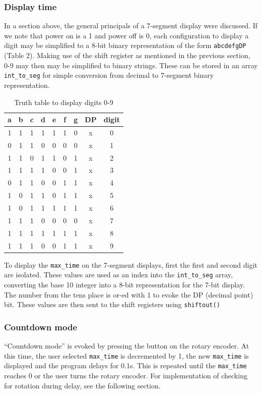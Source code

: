 \documentclass[fleqn]{article}
\begin{document}
\subsubsection*{Display time}
In a section above, the general principals of a 7-segment display were discussed. If we note that power on is a 1 and power off is 0, each configuration to display a digit may be simplified to a 8-bit binary representation of the form \verb|abcdefgDP| (Table 2). Making use of the shift register as mentioned in the previous section, 0-9 may then may be simplified to binary strings. These can be stored in an array \verb|int_to_seg| for simple conversion from decimal to 7-segment binary representation.
\begin{table}[H]
    \centering
    \setlength{\tabcolsep}{15pt}
    \begin{tabular}{cccccccc|c}
    \textbf{a} & \textbf{b} & \textbf{c} & \textbf{d} & \textbf{e} & \textbf{f} & \textbf{g} & \textbf{DP} & \textbf{digit} \\ \hline
    1 & 1 & 1 & 1 & 1 & 1 & 0 & x & 0 \\ \hline
    0 & 1 & 1 & 0 & 0 & 0 & 0 & x & 1 \\ \hline
    1 & 1 & 0 & 1 & 1 & 0 & 1 & x & 2 \\ \hline
    1 & 1 & 1 & 1 & 0 & 0 & 1 & x & 3 \\ \hline
    0 & 1 & 1 & 0 & 0 & 1 & 1 & x & 4 \\ \hline
    1 & 0 & 1 & 1 & 0 & 1 & 1 & x & 5 \\ \hline
    1 & 0 & 1 & 1 & 1 & 1 & 1 & x & 6 \\ \hline
    1 & 1 & 1 & 0 & 0 & 0 & 0 & x & 7 \\ \hline
    1 & 1 & 1 & 1 & 1 & 1 & 1 & x & 8 \\ \hline
    1 & 1 & 1 & 0 & 0 & 1 & 1 & x & 9 \\
    \end{tabular}
    \caption{Truth table to display digits 0-9}
\end{table}

To display the \verb|max_time| on the 7-segment displays, first the first and second digit are isolated. These values are used as an index into the \verb|int_to_seg| array, converting the base 10 integer into a 8-bit representation for the 7-bit display. The number from the tens place is or-ed with 1 to evoke the DP (decimal point) bit. These values are then sent to the shift registers using \verb|shiftout()|

\subsubsection*{Countdown mode}
``Countdown mode'' is evoked by pressing the button on the rotary encoder. At this time, the user selected \verb|max_time| is decremented by 1, the new \verb|max_time| is displayed and the program delays for 0.1s. This is repeated until the \verb|max_time| reaches 0 or the user turns the rotary encoder. For implementation of checking for rotation during delay, see the following section. 
\end{document}
